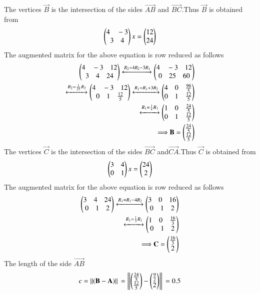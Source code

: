   The vertices $\vec{B}$ is the intersection of the sides $\vec{AB}$ and $\vec{BC}$.Thus $\vec{B}$ is obtained from
 \begin{align}
 \begin{pmatrix}4\quad-3\\3\quad4\end{pmatrix}x=\begin{pmatrix}12\\24\end{pmatrix}
 \end{align}
 The augmented matrix for the above equation is row reduced as follows
 \begin{align}
 \begin{pmatrix}4\quad-3\quad 12\\3\quad4\quad24\end{pmatrix}\xleftrightarrow{R_2=4R_2-3R_1}\begin{pmatrix}4\quad-3\quad 12\\0\quad25\quad60\end{pmatrix}\\\xleftrightarrow{R_2=\frac{1}{25}R_2}\begin{pmatrix}4\quad-3\quad 12\\0\quad1\quad\frac{12}{5}\end{pmatrix}\xleftrightarrow{R_1=R_1+3R_2}\begin{pmatrix}4\quad0\quad\frac{96}{5}\\0\quad1\quad\frac{12}{5}\end{pmatrix}\\
 \xleftrightarrow{R_1=\frac{1}{4}R_1}\begin{pmatrix}1\quad0\quad\frac{24}{5}\\0\quad1\quad\frac{12}{5}\end{pmatrix}\\
 \Longrightarrow\mathbf{B}=\begin{pmatrix}\frac{24}{5}\\\frac{12}{5}\end{pmatrix}
 \end{align}
 The vertices $\vec{C}$ is the intersection of the sides $\vec{BC}$ and$\vec{CA}$.Thus $\vec{C}$ is obtained from
 \begin{align}
 \begin{pmatrix}3\quad4\\0\quad 1\end{pmatrix}x=\begin{pmatrix}24\\2\end{pmatrix}
 \end{align}
 The augmented matrix for the above equation is row reduced as follows
\begin{align}
 \begin{pmatrix}3\quad4\quad 24\\0\quad1\quad2\end{pmatrix}\xleftrightarrow{R_1=R_1-4R_2}\begin{pmatrix}3\quad0\quad 16\\0\quad1\quad2\end{pmatrix}\\\xleftrightarrow{R_1=\frac{1}{3}R_1}\begin{pmatrix}1\quad0\quad\frac{16}{3}\\0\quad1\quad2\end{pmatrix}\\
 \Longrightarrow\mathbf{C}=\begin{pmatrix}\frac{16}{3}\\2\end{pmatrix}
 \end{align}
 The length of the side $\vec{AB}$
 \begin{equation}
  {c}=\left\lVert(\mathbf{B}-\mathbf{A})\right\rVert\\
    =\left\lVert\begin{pmatrix}\frac{24}{5}\\\frac{12}{5}\end{pmatrix}-\begin{pmatrix}\frac{9}{2}\\2\end{pmatrix}\right\rVert\\
    =0.5
\end{equation}
